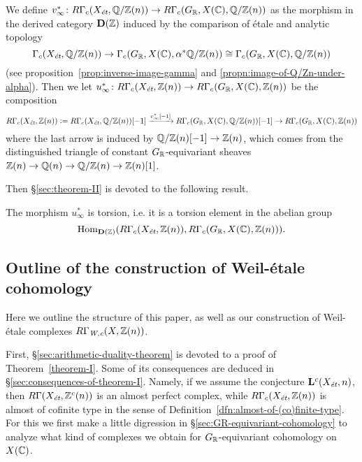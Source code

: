 \documentclass{article}
\numberwithin{equation}{section}
\begin{document}
\begin{definition}
  \label{dfn:u-infty}
  We define
  $v_\infty^*\colon R\Gamma_c (X_\et, \QQ/\ZZ (n)) \to R\Gamma_c (G_\RR, X (\CC), \QQ/\ZZ (n))$
  as the morphism in the derived category $\mathbf{D} (\ZZ)$ induced by the
  comparison of étale and analytic topology
  \[ \Gamma_c (X_\et, \QQ/\ZZ (n)) \to
  \Gamma_c (G_\RR, X (\CC), \alpha^* \QQ/\ZZ (n)) \cong
  \Gamma_c (G_\RR, X (\CC), \QQ/\ZZ (n)) \]
  (see proposition~\ref{prop:inverse-image-gamma} and
  \ref{propn:image-of-Q/Zn-under-alpha}). Then we let
  $u_\infty^*\colon R\Gamma_c (X_\et, \ZZ(n)) \to R\Gamma_c (G_\RR, X (\CC), \ZZ (n))$
  be the composition
  \[ R\Gamma_c (X_\et, \ZZ(n)) \dfn R\Gamma_c (X_\et, \QQ/\ZZ (n)) [-1]
  \xrightarrow{v_\infty^* [-1]} R\Gamma_c (G_\RR, X (\CC), \QQ/\ZZ (n)) [-1] \to
  R\Gamma_c (G_\RR, X (\CC), \ZZ (n)) \]
  where the last arrow is induced by $\QQ/\ZZ (n) [-1] \to \ZZ (n)$, which comes
  from the distinguished triangle of constant $G_\RR$-equivariant sheaves
  $\ZZ (n) \to \QQ (n) \to \QQ/\ZZ (n) \to \ZZ (n) [1]$.
\end{definition}

Then \S\ref{sec:theorem-II} is devoted to the following result.

\begin{maintheorem}
  \label{theorem-II}
  The morphism $u_\infty^*$ is torsion, i.e. it is a torsion element in the
  abelian group
  $$\Hom_{\mathbf{D} (\ZZ)} (R\Gamma_c (X_\et, \ZZ(n)), R\Gamma_c (G_\RR, X (\CC), \ZZ(n))).$$
\end{maintheorem}

\subsection*{Outline of the construction of Weil-étale cohomology}

Here we outline the structure of this paper, as well as our construction of
Weil-étale complexes $R\Gamma_\Wc (X, \ZZ (n))$.

First, \S\ref{sec:arithmetic-duality-theorem} is devoted to a proof of
Theorem~\ref{theorem-I}. Some of its consequences are deduced in
\S\ref{sec:consequences-of-theorem-I}. Namely, if we assume the conjecture
$\mathbf{L}^c (X_\et, n)$, then $R\Gamma (X_\et, \ZZ^c (n))$ is an almost
perfect complex, while $R\Gamma_c (X_\et, \ZZ (n))$ is almost of cofinite type
in the sense of Definition~\ref{dfn:almost-of-(co)finite-type}. For this we
first make a little digression in \S\ref{sec:GR-equivariant-cohomology} to
analyze what kind of complexes we obtain for $G_\RR$-equivariant cohomology on
$X (\CC)$.
\end{document}

